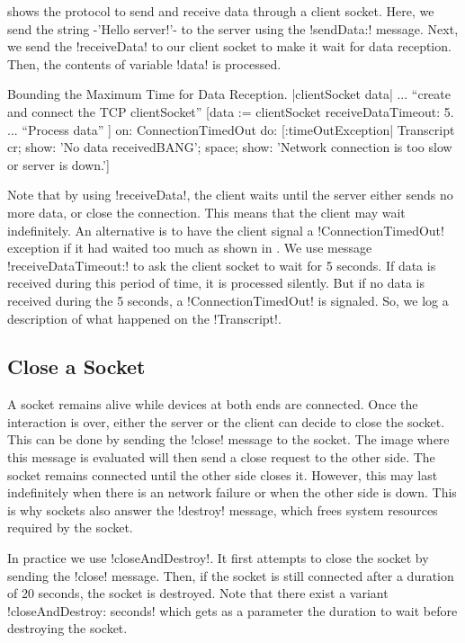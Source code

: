 \documentclass[a4paper,10pt,twoside]{book}
\begin{document}
 shows the protocol to send and receive data through a client socket.
Here, we send the string \ct-'Hello server!'- to the server using the \ct!sendData:! message.
Next, we send the \ct!receiveData! to our client socket to make it wait for data reception.
Then, the contents of variable \ct!data! is processed.

\begin{script}[dataReceptionTimeOut]{Bounding the Maximum Time for Data Reception.}
|clientSocket data|
... ``create and connect the TCP clientSocket''
[data := clientSocket receiveDataTimeout: 5.
... ``Process data''
] on: ConnectionTimedOut 
do: [:timeOutException|
	Transcript 
		cr; 
		show: 'No data receivedBANG';
		space;
		show: 'Network connection is too slow or server is down.']
\end{script}

Note that by using  \ct!receiveData!, the client waits until the server either sends no more data, or close the connection.
This means that the client may wait indefinitely.
An alternative is to have the client signal a \ct!ConnectionTimedOut! exception if it had waited too much as shown in .
We use message \ct!receiveDataTimeout:! to ask the client socket to wait for 5 seconds.
If data is received during this period of time, it is processed silently.
But if no data is received during the 5 seconds, a \ct!ConnectionTimedOut! is signaled.
So, we log a description of what happened on the \ct!Transcript!.

\subsection{Close a Socket}
A socket remains alive while devices at both ends are connected.
Once the interaction is over, either the server or the client can decide to close the socket.
This can be done by sending the \ct!close! message to the socket.
The image where this message is evaluated will then send a close request to the other side.
The socket remains connected until the other side closes it.
However, this may last indefinitely when there is an network failure or when the other side is down.
This is why sockets also answer the \ct!destroy! message, which frees system resources required by the socket.

In practice we use \ct!closeAndDestroy!. It first attempts to close the socket by sending the \ct!close! message.
Then, if the socket is still connected after a duration of 20 seconds, the socket is destroyed.
Note that there exist a variant \ct!closeAndDestroy: seconds! which gets as a parameter the duration to wait before destroying the socket.
\end{document}
